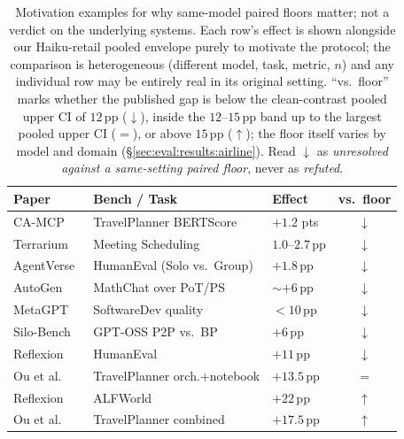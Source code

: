 \begin{table}[t]
\centering
\caption{Motivation examples for why same-model paired floors
matter; not a verdict on the underlying systems. Each row's
effect is shown alongside our Haiku-retail pooled envelope
purely to motivate the protocol; the comparison is heterogeneous
(different model, task, metric, $n$) and any individual row may
be entirely real in its original setting. ``vs.\ floor'' marks
whether the published gap is below the clean-contrast pooled
upper CI of $12$\,pp ($\downarrow$), inside the $12$--$15$\,pp
band up to the largest pooled upper CI ($=$), or above
$15$\,pp ($\uparrow$); the floor itself varies by model
and domain (\S\ref{sec:eval:results:airline}). Read $\downarrow$
as \emph{unresolved against a same-setting paired floor}, never
as \emph{refuted}.}
\label{tab:literature-vs-floor}
\small
\setlength{\tabcolsep}{4pt}
\begin{tabular}{lll@{\hspace{6pt}}c}
\toprule
Paper & Bench / Task & Effect & vs.\ floor \\
\midrule
CA-MCP~\cite{camcp2026}            & TravelPlanner BERTScore & $+1.2$ pts & $\downarrow$ \\
Terrarium~\cite{terrarium2025}     & Meeting Scheduling      & $1.0$--$2.7$\,pp & $\downarrow$ \\
AgentVerse~\cite{agentverse2023}   & HumanEval (Solo vs.\ Group)  & $+1.8$\,pp  & $\downarrow$ \\
AutoGen~\cite{autogen2023}         & MathChat over PoT/PS    & $\sim$$+6$\,pp & $\downarrow$ \\
MetaGPT~\cite{metagpt2024}         & SoftwareDev quality     & $<10$\,pp & $\downarrow$ \\
Silo-Bench~\cite{silobench2026}    & GPT-OSS P2P vs.\ BP     & $+6$\,pp & $\downarrow$ \\
Reflexion~\cite{reflexion2023}     & HumanEval                  & $+11$\,pp   & $\downarrow$ \\
\midrule
Ou et al.~\cite{ou2025coordination} & TravelPlanner orch.+notebook & $+13.5$\,pp & $=$ \\
\midrule
Reflexion~\cite{reflexion2023}     & ALFWorld                    & $+22$\,pp & $\uparrow$ \\
Ou et al.~\cite{ou2025coordination} & TravelPlanner combined     & $+17.5$\,pp & $\uparrow$ \\
\bottomrule
\end{tabular}
\end{table}

